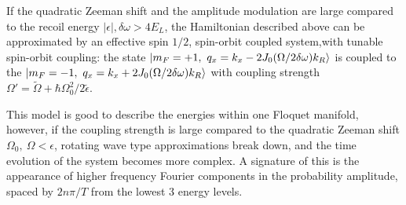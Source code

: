 If the quadratic Zeeman shift and the amplitude modulation are large compared to the recoil energy $|\epsilon|, \delta\omega >4E_L$, the Hamiltonian described above can be approximated by an effective spin $1/2$, spin-orbit coupled system,with tunable spin-orbit coupling: the state $\ket{m_F=+1,\ q_x=k_x-2J_0(\Omega/2\delta\omega)k_R}$ is coupled to the $\ket{m_F=-1,\ q_x=k_x+2J_0(\Omega/2\delta\omega)k_R}$ with coupling strength  $\Omega'=\tilde{\Omega}+\hbar\Omega_0^2/2\tilde{\epsilon}$.

This model is good to describe the energies within one Floquet manifold, however, if the coupling strength is large compared to the quadratic Zeeman shift $\Omega_0,\ \Omega<\epsilon$, rotating wave type approximations break down, and the time evolution of the system becomes more complex. A signature of this is the appearance of higher frequency Fourier components in the probability amplitude, spaced by $2n\pi/T$ from the lowest 3 energy levels. 
 












